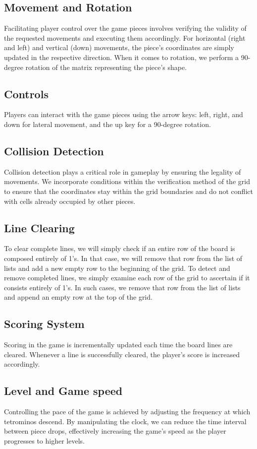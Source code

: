 \documentclass[conference]{IEEEtran}
\begin{document}
\subsection{Movement and Rotation}
Facilitating player control over the game pieces involves verifying the validity of the requested movements and executing them accordingly. For horizontal (right and left) and vertical (down) movements, the piece's coordinates are simply updated in the respective direction. When it comes to rotation, we perform a 90-degree rotation of the matrix representing the piece's shape.
\subsection{Controls}
Players can interact with the game pieces using the arrow keys: left, right, and down for lateral movement, and the up key for a 90-degree rotation.
\subsection{Collision Detection}
Collision detection plays a critical role in gameplay by ensuring the legality of movements. We incorporate conditions within the verification method of the grid to ensure that the coordinates stay within the grid boundaries and do not conflict with cells already occupied by other pieces.
\subsection{Line Clearing}
To clear complete lines, we will simply check if an entire row of the board is composed entirely of 1's. In that case, we will remove that row from the list of lists and add a new empty row to the beginning of the grid.
To detect and remove completed lines, we simply examine each row of the grid to ascertain if it consists entirely of 1's. In such cases, we remove that row from the list of lists and append an empty row at the top of the grid.
\subsection{Scoring System}
Scoring in the game is incrementally updated each time the board lines are cleared. Whenever a line is successfully cleared, the player's score is increased accordingly.
\subsection{Level and Game speed}
Controlling the pace of the game is achieved by adjusting the frequency at which tetrominos descend. By manipulating the clock, we can reduce the time interval between piece drops, effectively increasing the game's speed as the player progresses to higher levels.
\end{document}
